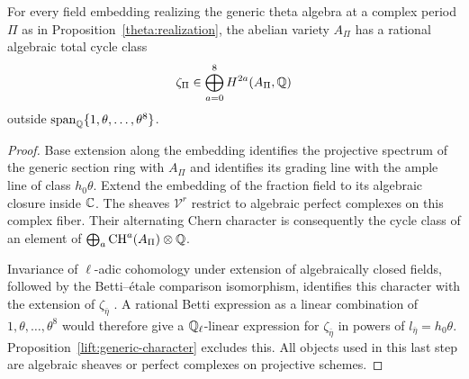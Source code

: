 \begin{proposition}
\label{lift:complex-class}
For every field embedding realizing the generic theta algebra at a
complex period $\Pi$ as in Proposition~\ref{theta:realization}, the abelian
variety $A_\Pi$ has a rational algebraic total cycle class
\[
 \zeta_\Pi\in\bigoplus_{a=0}^8H^{2a}(A_\Pi,\mathbb Q)
\]
outside $\operatorname{span}_\mathbb Q\{1,\theta,\ldots,\theta^8\}$.
\end{proposition}

\begin{proof}
Base extension along the embedding identifies the projective spectrum
of the generic section ring with $A_\Pi$ and identifies its grading line
with the ample line of class $h_0\theta$.  Extend the embedding of the
fraction field to its algebraic closure inside $\mathbb C$.  The sheaves
$\mathcal V^r$ restrict to algebraic perfect complexes on this complex
fiber.  Their alternating Chern character is consequently the cycle
class of an element of $\bigoplus_a\operatorname{CH}^a(A_\Pi)\otimes\mathbb Q$.

Invariance of $\ell$-adic cohomology under extension of algebraically
closed fields, followed by the Betti--\'etale comparison isomorphism,
identifies this character with the extension of $\zeta_{\bar\eta}$
\cite{smooth-proper}.  A rational Betti expression as a linear
combination of $1,\theta,\ldots,\theta^8$ would therefore give a
$\mathbb Q_\ell$-linear expression for $\zeta_{\bar\eta}$ in powers of
$l_{\bar\eta}=h_0\theta$.  Proposition~\ref{lift:generic-character}
excludes this.  All objects used in this last step are algebraic
sheaves or perfect complexes on projective schemes.
\end{proof}
